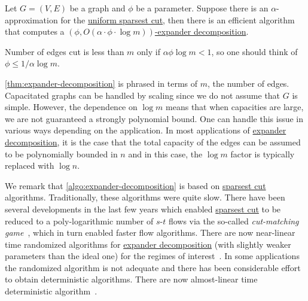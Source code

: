\begin{corollary}\label{col:expander-decomposition}
	Let \(G = (V, E)\) be a graph and \(\phi \) be a parameter. Suppose there is an \(\alpha \)-approximation for the \hyperref[prb:sparsest-cut]{uniform sparsest cut}, then there is an efficient algorithm that computes a \hyperref[def:expander-decomposition]{\((\phi , O(\alpha \cdot \phi \cdot \log m))\)-expander decomposition}.
\end{corollary}

\begin{note}
	Number of edges cut is less than \(m\) only if \(\alpha \phi \log m < 1\), so one should think of \(\phi \leq 1 / \alpha \log m\).
\end{note}

\begin{remark}
	\autoref{thm:expander-decomposition} is phrased in terms of \(m\), the number of edges. Capacitated graphs can be handled by scaling since we do not assume that \(G\) is simple. However, the dependence on \(\log m\) means that when capacities are large, we are not guaranteed a strongly polynomial bound. One can handle this issue in various ways depending on the application. In most applications of \hyperref[def:expander-decomposition]{expander decomposition}, it is the case that the total capacity of the edges can be assumed to be polynomially bounded in \(n\) and in this case, the \(\log m\) factor is typically replaced with \(\log n\).
\end{remark}

We remark that \autoref{algo:expander-decomposition} is based on \hyperref[prb:sparsest-cut]{sparsest cut} algorithms. Traditionally, these algorithms were quite slow. There have been several developments in the last few years which enabled \hyperref[prb:sparsest-cut]{sparsest cut} to be reduced to a poly-logarithmic number of \(s\)-\(t\) flows via the so-called \emph{cut-matching game}~\cite{khandekar2009graph,orecchia2008partitioning}, which in turn enabled faster flow algorithms. There are now near-linear time randomized algorithms for \hyperref[def:expander-decomposition]{expander decomposition} (with slightly weaker parameters than the ideal one) for the regimes of interest~\cite{saranurak2019expander}. In some applications the randomized algorithm is not adequate and there has been considerable effort to obtain deterministic algorithms. There are now almost-linear time deterministic algorithm~\cite{chuzhoy2020deterministic,saranurak2021deterministic}.

